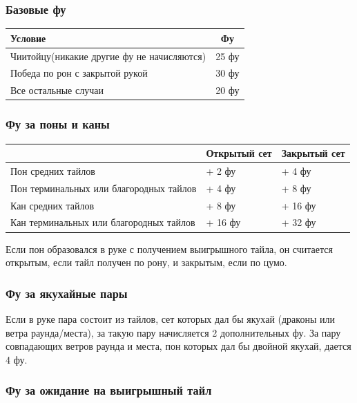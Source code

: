 \subsubsection{Базовые фу}
\begin{tabular}{lc}
	\toprule
	Условие & Фу\\
	\midrule
	Чиитойцу(никакие другие фу не начисляются) & 25 фу\\
	\midrule
	Победа по рон с закрытой рукой & 30 фу\\
	\midrule
	Все остальные случаи & 20 фу\\
	\bottomrule
\end{tabular}


\subsubsection{Фу за поны и каны}

\noindent\begin{tabular}{L{7cm}C{3cm}C{3cm}}
	\toprule
	& Открытый сет &
	Закрытый сет \\
	\midrule
	Пон средних тайлов &
	+ 2 фу &
	+ 4 фу \\
	\midrule
	Пон терминальных или благородных тайлов &
	+ 4 фу &
	+ 8 фу \\
	\midrule
	Кан средних тайлов &
	+ 8 фу &
	+ 16 фу \\
	\midrule
	Кан терминальных или благородных тайлов &
	+ 16 фу &
	+ 32 фу \\
	\bottomrule
\end{tabular}

Если пон образовался в руке с получением выигрышного тайла, он считается открытым, если тайл получен по рону, и закрытым, если по цумо. 

\subsubsection{Фу за якухайные пары}

Если в руке пара состоит из тайлов, сет которых дал бы якухай (драконы или ветра раунда/места), за такую пару начисляется 2 дополнительных фу. За пару совпадающих ветров раунда и места, пон которых дал бы двойной якухай, дается 4 фу. 



\subsubsection{Фу за ожидание на выигрышный тайл}

